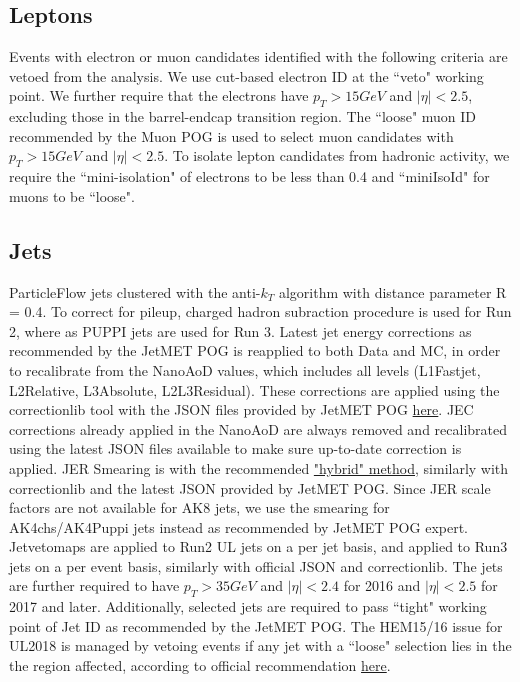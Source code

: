 \documentclass[twoside]{article}
\begin{document}
\subsection{Leptons}
\label{sec:leptons}
Events with electron or muon candidates identified with the following criteria are vetoed from the analysis. We use cut-based electron ID at the ``veto" working point. We further require that the electrons have $p_T > 15 GeV$ and $\left| \eta \right| < 2.5$, excluding those in the barrel-endcap transition region. The ``loose" muon ID recommended by the Muon POG is used to select muon candidates with $p_T > 15 GeV$ and $\left| \eta \right| < 2.5$. To isolate lepton candidates from hadronic activity, we require the ``mini-isolation" of electrons to be less than 0.4 and ``miniIsoId" for muons to be ``loose".
\subsection{Jets}
ParticleFlow jets clustered with the anti-$k_T$ algorithm with distance parameter R = 0.4. To correct for pileup, charged hadron subraction procedure is used for Run 2, where as PUPPI jets are used for Run 3. Latest jet energy corrections as recommended by the JetMET POG is reapplied to both Data and MC, in order to recalibrate from the NanoAoD values, which includes all levels (L1Fastjet, L2Relative, L3Absolute, L2L3Residual). These corrections are applied using the correctionlib tool with the JSON files provided by JetMET POG \href{https://gitlab.cern.ch/cms-nanoAOD/jsonpog-integration/-/tree/master/POG/JME}{here}. JEC corrections already applied in the NanoAoD are always removed and recalibrated using the latest JSON files available to make sure up-to-date correction is applied. JER Smearing is with the recommended \href{https://cms-jerc.web.cern.ch/JER/#smearing-procedures}{"hybrid" method}, similarly with correctionlib and the latest JSON provided by JetMET POG. Since JER scale factors are not available for AK8 jets, we use the smearing for AK4chs/AK4Puppi jets instead as recommended by JetMET POG expert. Jetvetomaps are applied to Run2 UL jets on a per jet basis, and applied to Run3 jets on a per event basis, similarly with official JSON and correctionlib. The jets are further required to have $p_T > 35 GeV$ and $\left| \eta \right| <2.4$ for 2016 and $\left| \eta \right| <2.5$ for 2017 and later. Additionally, selected jets are required to pass ``tight" working point of Jet ID as recommended by the JetMET POG. The HEM15/16 issue for UL2018 is managed by vetoing events if any jet with a ``loose" selection lies in the the region affected, according to official recommendation \href{https://cms-talk.web.cern.ch/t/question-about-hem15-16-issue-in-2018-ultra-legacy/38654?u=gagarwal}{here}.
\end{document}

